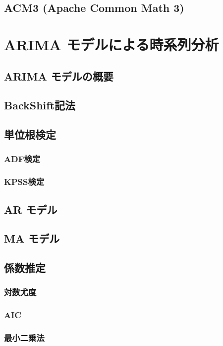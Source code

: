 \documentclass{scrartcl}
\begin{document}
\subsection{ACM3 (Apache Common Math 3)}
\label{sec:org939326c}
\section{ARIMA モデルによる時系列分析}
\label{sec:org7817818}
\subsection{ARIMA モデルの概要}
\label{sec:org036a453}
\subsection{BackShift記法}
\label{sec:orgca8702b}
\subsection{単位根検定}
\label{sec:org2fc5a63}
\subsubsection{ADF検定}
\label{sec:org08a6c4d}
\subsubsection{KPSS検定}
\label{sec:orga21458f}
\subsection{AR モデル}
\label{sec:org1e36e36}
\subsection{MA モデル}
\label{sec:orge1a0475}
\subsection{係数推定}
\label{sec:orgdd5acee}
\subsubsection{対数尤度}
\label{sec:org8a7718e}
\subsubsection{AIC}
\label{sec:orgf11388a}
\subsubsection{最小二乗法}
\label{sec:org2be131a}
\end{document}
